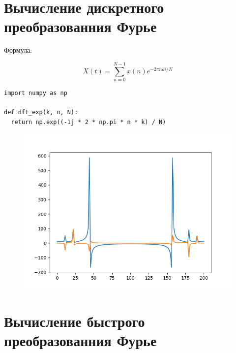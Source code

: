 \documentclass[12pt]{article}
\begin{document}
\section{Вычисление дискретного преобразованния Фурье}
Формула:

\[X(t)=\sum_{n=0}^{N-1}x(n)e^{-2\pi nki / N}\]
 


\begin{lstlisting}
import numpy as np

def dft_exp(k, n, N):
  return np.exp((-1j * 2 * np.pi * n * k) / N)
\end{lstlisting}

\begin{figure}[!htb]
\centering
\includegraphics[scale=1.00]{func_dft.png}
\caption{}
\label{}
\end{figure}



\section{Вычисление быстрого преобразованния Фурье}

\end{document}
